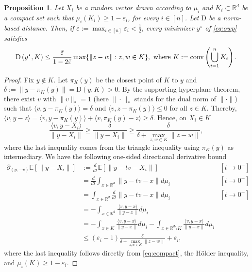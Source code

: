 \documentclass[letter,11pt, reqno]{amsart}
\newcommand{\R}{\mathbb{R}}
\newcommand{\E}{\mathbb{E}}
\newcommand{\D}{\mathrm{D}}
\newcommand{\conv}{{\rm conv}}
\renewcommand{\;}{\quad}
\theoremstyle{thmstyleone}%
\newtheorem{proposition}[theorem]{Proposition}%
\theoremstyle{thmstyletwo}%
\theoremstyle{thmstylethree}%
\begin{document}
\begin{proposition}\label{prop:eps-hull}
Let $X_i$ be a random vector drawn according to $\mu_i$ and $K_i\subset\R^d$ be a compact set such that
$\mu_i(K_i)\ge1-\varepsilon_i$, for every $i\in[n]$. Let $\D$ be a norm-based distance. Then, if $\bar\varepsilon :=  \max_{i\in [n]}\varepsilon_i<\frac{1}{2}$, every minimizer $y^\star$ of \ref{eq:owp} satisfies
\begin{equation*}
    \D\left(y^\star, K\right) \le \frac{\bar\varepsilon}{1-2\bar\varepsilon}\max\{\|z-w\|: z,w\in K\}, \text{ where } K:=\conv\left(\bigcup_{i=1}^n K_i\right).
\end{equation*}
\end{proposition}
\begin{proof}
Fix $y\notin K$. Let $\pi_K(y)$ be the closest point of $K$ to $y$ and $\delta:=\|y-\pi_K(y)\|=\D(y,K)>0$. By the supporting hyperplane theorem, there exist  $v$ with $\|v\|_*=1$ (here $\|\cdot\|_*$ stands for the dual norm of $\|\cdot\|$) such that $\langle v,y-\pi_K(y)\rangle=\delta$ and $\langle v,z-\pi_K(y)\rangle\le 0$ for all $z\in K$. Thereby, $\langle v,y-z\rangle=\langle v,y-\pi_K(y)\rangle+\langle v,\pi_K(y)-z\rangle\ge \delta$. Hence, on $X_i\in K$
\begin{equation}\label{eq:compact}
    \frac{\langle v,y-X_i\rangle}{\|y-X_i\|}\ge\frac{\delta}{\|y-X_i\|}\ge\frac{\delta}{\delta+ \max_{z, w \in K}\|z-w\|},
\end{equation}
where the last inequality comes from the triangle inequality using $\pi_K(y)$ as intermediary.
We have the following one-sided directional derivative bound
\begin{align*}
        \partial_{(y;-v)} \E[\|y - X_i\|]&:=\frac{d}{dt}\E\left[\|y-tv-X_i\|\right] & [t\to 0^+] \\
        &=\frac{d}{dt}\int_{x\in \R^d}\|y-tv-x\|d\mu_i & [t\to 0^+] \\
        & = \int_{x\in \R^d}\frac{d}{dt}\|y-tv-x\|d\mu_i & [t\to 0^+] \\
        & = -\int_{x\in \R^d}\frac{\langle v, y-x\rangle}{\|y-x\|}d\mu_i & \\
        & = -\int_{x\in K}\frac{\langle v, y-x\rangle}{\|y-x\|}d\mu_i - \int_{x\in \R^d\setminus K}\frac{\langle v, y-x\rangle}{\|y-x\|}d\mu_i &\\
        & \leq (\varepsilon_i-1)\frac{\delta}{\delta+\max_{z, w \in K}\|z-w\|}+\varepsilon_i,
\end{align*}
where the last inequality follows directly from \eqref{eq:compact}, the H\"older inequality, and $\mu_i(K)\geq 1-\varepsilon_i$.


\end{proof}
\end{document}
